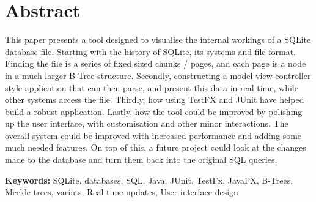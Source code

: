 \section*{\centering Abstract}

This paper presents a tool designed to visualise the internal workings of a SQLite database file. Starting with the history of SQLite, its systems and file format. Finding the file is a series of fixed sized chunks / pages, and each page is a node in a much larger B-Tree structure. Secondly, constructing a model-view-controller style application that can then parse, and present this data in real time, while other systems access the file. Thirdly, how using TestFX and JUnit have helped build a robust application. Lastly, how the tool could be improved by polishing up the user interface, with customisation and other minor interactions. The overall system could be improved with increased performance and adding some much needed features. On top of this, a future project could look at the changes made to the database and turn them back into the original SQL queries. 

\vspace{1.5cm}

\textbf{Keywords:} SQLite, databases, SQL, Java, JUnit, TestFx, JavaFX, B-Trees, Merkle trees, varints, Real time updates, User interface design